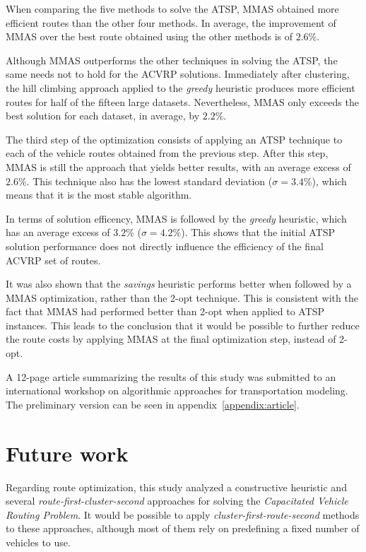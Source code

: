 When comparing the five methods to solve the ATSP, MMAS obtained more efficient
routes than the other four methods. In average, the improvement of MMAS over
the best route obtained using the other methods is of $2.6\%$.

Although MMAS outperforms the other techniques in solving the ATSP, the same
needs not to hold for the ACVRP solutions. Immediately after clustering, the
hill climbing approach applied to the \textit{greedy} heuristic produces more
efficient routes for half of the fifteen large datasets. Nevertheless, MMAS
only exceeds the best solution for each dataset, in average, by $2.2\%$.

The third step of the optimization consists of applying an ATSP technique to
each of the vehicle routes obtained from the previous step. After this step,
MMAS is still the approach that yields better results, with an average excess of
$2.6\%$. This technique also has the lowest standard deviation ($\sigma=3.4\%$),
which means that it is the most stable algorithm.

In terms of solution efficency, MMAS is followed by the \textit{greedy}
heuristic, which has an average excess of $3.2\%$ ($\sigma=4.2\%$). This shows
that the initial ATSP solution performance does not directly influence the
efficiency of the final ACVRP set of routes.

It was also shown that the \textit{savings} heuristic performs better when
followed by a MMAS optimization, rather than the 2-opt technique. This is
consistent with the fact that MMAS had performed better than 2-opt when applied
to ATSP instances. This leads to the conclusion that it would be possible to
further reduce the route costs by applying MMAS at the final optimization step,
instead of 2-opt.

A 12-page article summarizing the results of this study was submitted to an
international workshop on algorithmic approaches for transportation modeling.
The preliminary version can be seen in appendix~\ref{appendix:article}.


\section{Future work}
\label{section:future-work}

Regarding route optimization, this study analyzed a constructive heuristic and
several \textit{route-first-cluster-second} approaches for solving the
\textit{Capacitated Vehicle Routing Problem}. It would be possible to apply
\textit{cluster-first-route-second} methods to these approaches, although most
of them rely on predefining a fixed number of vehicles to use.

